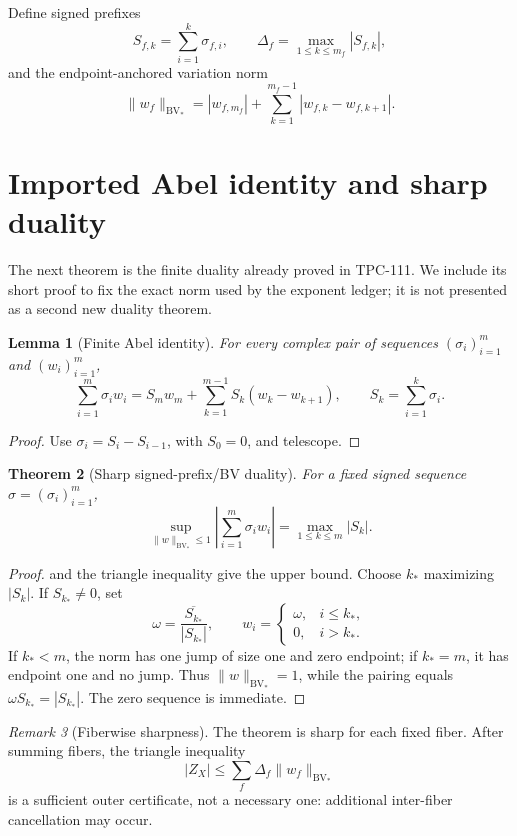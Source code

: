 \documentclass[11pt]{article}
\newtheorem{theorem}{Theorem}[section]
\newtheorem{lemma}[theorem]{Lemma}
\theoremstyle{definition}
\theoremstyle{remark}
\newtheorem{remark}[theorem]{Remark}
\begin{document}
Define signed prefixes
\[
 S_{f,k}=\sum_{i=1}^k\sigma_{f,i},\qquad
 \Delta_f=\max_{1\le k\le m_f}|S_{f,k}|,
\]
and the endpoint-anchored variation norm
\[
 \|w_f\|_{\mathrm{BV}_*}
 =
 |w_{f,m_f}|
 +\sum_{k=1}^{m_f-1}|w_{f,k}-w_{f,k+1}|.
\]

\section{Imported Abel identity and sharp duality}

The next theorem is the finite duality already proved in TPC-111.  We
include its short proof to fix the exact norm used by the exponent
ledger; it is not presented as a second new duality theorem.

\begin{lemma}[Finite Abel identity]
\label{lem:abel}
For every complex pair of sequences
\((\sigma_i)_{i=1}^m\) and \((w_i)_{i=1}^m\),
\[
 \boxed{
 \sum_{i=1}^m\sigma_iw_i
 =
 S_mw_m+\sum_{k=1}^{m-1}S_k(w_k-w_{k+1}),}
\qquad
 S_k=\sum_{i=1}^k\sigma_i.
\]
\end{lemma}

\begin{proof}
Use \(\sigma_i=S_i-S_{i-1}\), with \(S_0=0\), and telescope.
\end{proof}

\begin{theorem}[Sharp signed-prefix/BV duality]
\label{thm:duality}
For a fixed signed sequence \(\sigma=(\sigma_i)_{i=1}^m\),
\[
 \boxed{
 \sup_{\|w\|_{\mathrm{BV}_*}\le1}
 \left|\sum_{i=1}^m\sigma_iw_i\right|
 =\max_{1\le k\le m}|S_k|.}
\]
\end{theorem}

\begin{proof}
 and the triangle inequality give the upper bound.
Choose \(k_*\) maximizing \(|S_k|\).  If \(S_{k_*}\ne0\), set
\[
 \omega=\frac{\overline{S_{k_*}}}{|S_{k_*}|},
 \qquad
 w_i=\begin{cases}
 \omega,&i\le k_*,\\
 0,&i>k_*.
 \end{cases}
\]
If \(k_*<m\), the norm has one jump of size one and zero endpoint;
if \(k_*=m\), it has endpoint one and no jump.  Thus
\(\|w\|_{\mathrm{BV}_*}=1\), while the pairing equals
\(\omega S_{k_*}=|S_{k_*}|\).  The zero sequence is immediate.
\end{proof}

\begin{remark}[Fiberwise sharpness]
The theorem is sharp for each fixed fiber.  After summing fibers, the
triangle inequality
\[
 |Z_X|\le\sum_f\Delta_f\|w_f\|_{\mathrm{BV}_*}
\]
is a sufficient outer certificate, not a necessary one: additional
inter-fiber cancellation may occur.
\end{remark}
\end{document}
